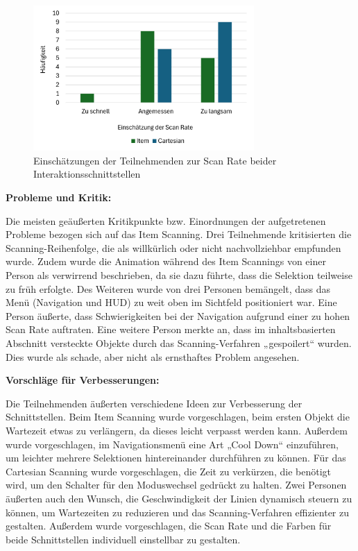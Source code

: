 \begin{figure}[tbh]
    \centering
    \includegraphics[width=0.75\textwidth]{images/Results/ScanRate.png}
    \caption{Einschätzungen der Teilnehmenden zur Scan Rate beider Interaktionsschnittstellen}
    \label{fig:scanrate}
\end{figure}

\textbf{Probleme und Kritik:}

Die meisten geäußerten Kritikpunkte bzw. Einordnungen der aufgetretenen Probleme bezogen sich auf das Item Scanning. Drei Teilnehmende kritisierten die Scanning-Reihenfolge, die als willkürlich oder nicht nachvollziehbar empfunden wurde. Zudem wurde die Animation während des Item Scannings von einer Person als verwirrend beschrieben, da sie dazu führte, dass die Selektion teilweise zu früh erfolgte. Des Weiteren wurde von drei Personen bemängelt, dass das Menü (Navigation und HUD) zu weit oben im Sichtfeld positioniert war. Eine Person äußerte, dass Schwierigkeiten bei der Navigation aufgrund einer zu hohen Scan Rate auftraten. Eine weitere Person merkte an, dass im inhaltsbasierten Abschnitt versteckte Objekte durch das Scanning-Verfahren „gespoilert“ wurden. Dies wurde als schade, aber nicht als ernsthaftes Problem angesehen. 

\textbf{Vorschläge für Verbesserungen:}

Die Teilnehmenden äußerten verschiedene Ideen zur Verbesserung der Schnittstellen. Beim Item Scanning wurde vorgeschlagen, beim ersten Objekt die Wartezeit etwas zu verlängern, da dieses leicht verpasst werden kann. Außerdem wurde vorgeschlagen, im Navigationsmenü eine Art „Cool Down“ einzuführen, um leichter mehrere Selektionen hintereinander durchführen zu können. Für das Cartesian Scanning wurde vorgeschlagen, die Zeit zu verkürzen, die benötigt wird, um den Schalter für den Moduswechsel gedrückt zu halten. Zwei Personen äußerten auch den Wunsch, die Geschwindigkeit der Linien dynamisch steuern zu können, um Wartezeiten zu reduzieren und das Scanning-Verfahren effizienter zu gestalten. Außerdem wurde vorgeschlagen, die Scan Rate und die Farben für beide Schnittstellen individuell einstellbar zu gestalten.

